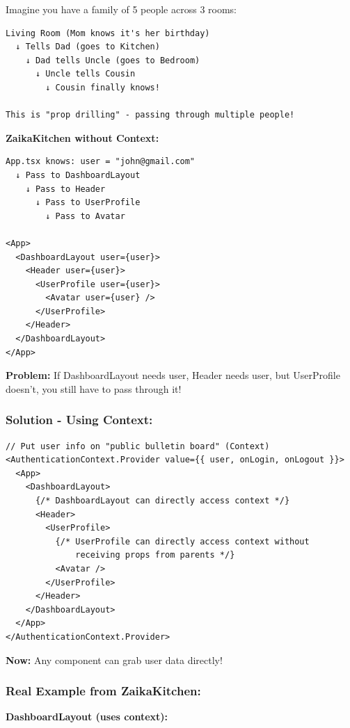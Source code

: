 \documentclass[12pt]{article}
\begin{document}
Imagine you have a family of 5 people across 3 rooms:

\begin{lstlisting}
Living Room (Mom knows it's her birthday)
  ↓ Tells Dad (goes to Kitchen)
    ↓ Dad tells Uncle (goes to Bedroom)
      ↓ Uncle tells Cousin
        ↓ Cousin finally knows!

This is "prop drilling" - passing through multiple people!
\end{lstlisting}

\textbf{ZaikaKitchen without Context:}

\begin{lstlisting}
App.tsx knows: user = "john@gmail.com"
  ↓ Pass to DashboardLayout
    ↓ Pass to Header
      ↓ Pass to UserProfile
        ↓ Pass to Avatar

<App>
  <DashboardLayout user={user}>
    <Header user={user}>
      <UserProfile user={user}>
        <Avatar user={user} />
      </UserProfile>
    </Header>
  </DashboardLayout>
</App>
\end{lstlisting}

\textbf{Problem:} If DashboardLayout needs user, Header needs user, but UserProfile doesn't, you still have to pass through it!

\subsubsection*{Solution - Using Context:}

\begin{lstlisting}
// Put user info on "public bulletin board" (Context)
<AuthenticationContext.Provider value={{ user, onLogin, onLogout }}>
  <App>
    <DashboardLayout>
      {/* DashboardLayout can directly access context */}
      <Header>
        <UserProfile>
          {/* UserProfile can directly access context without 
              receiving props from parents */}
          <Avatar />
        </UserProfile>
      </Header>
    </DashboardLayout>
  </App>
</AuthenticationContext.Provider>
\end{lstlisting}

\textbf{Now:} Any component can grab user data directly!

\subsubsection*{Real Example from ZaikaKitchen:}

\textbf{DashboardLayout (uses context):}
\end{document}
